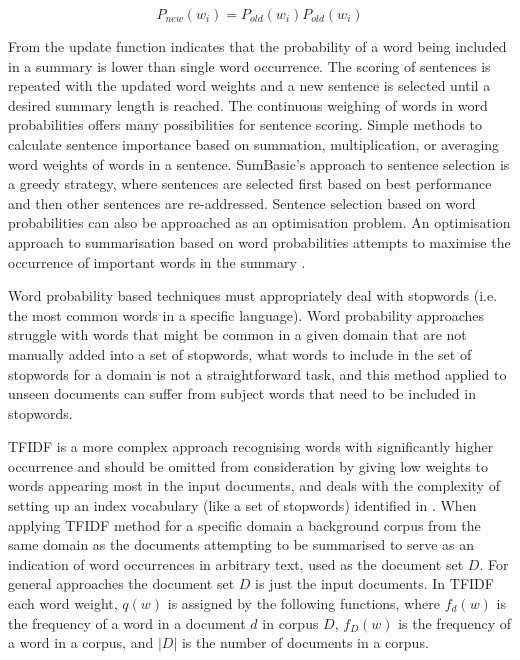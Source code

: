 \begin{equation}
      P_{new}(w_i) = P_{old}(w_i)P_{old}(w_i)
      \label{updateProb}
\end{equation}

From the update function indicates that the probability of a word being included in a summary is lower than single word occurrence. The scoring of sentences is repeated with the updated word weights and a new sentence is selected until a desired summary length is reached. The continuous weighing of words in word probabilities offers many possibilities for sentence scoring. Simple methods to calculate sentence importance based on summation, multiplication, or averaging word weights of words in a sentence. SumBasic’s approach to sentence selection is a greedy strategy, where sentences are selected first based on best performance and then other sentences are re-addressed. Sentence selection based on word probabilities can also be approached as an optimisation problem. An optimisation approach to summarisation based on word probabilities attempts to maximise the occurrence of important words in the summary \citep{yih2007multi}.

Word probability based techniques must appropriately deal with stopwords (i.e. the most common words in a specific language). Word probability approaches struggle with words that might be common in a given domain that are not manually added into a set of stopwords, what words to include in the set of stopwords for a domain is not a straightforward task, and this method applied to unseen documents can suffer from subject words that need to be included in stopwords.

TFIDF is a more complex approach recognising words with significantly higher occurrence and should be omitted from consideration by giving low weights to words appearing most in the input documents, and deals with the complexity of setting up an index vocabulary (like a set of stopwords) identified in \citep{jones1972statistical,salton1988term}. When applying TFIDF method for a specific domain a background corpus from the same domain as the documents attempting to be summarised to serve as an indication of word occurrences in arbitrary text, used as the document set $D$. For general approaches the document set $D$ is just the input documents. In TFIDF each word weight, $q(w)$ is assigned by the following functions, where $f_d(w)$ is the frequency of a word in a document $d$ in corpus $D$, $f_D(w)$ is the frequency of a word in a corpus, and $|D|$ is the number of documents in a corpus. 

